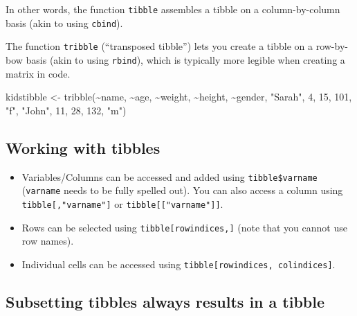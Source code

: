 \documentclass[
]{book}
\newenvironment{Shaded}{\begin{snugshade}}{\end{snugshade}}
\newcommand{\DecValTok}[1]{\textcolor[rgb]{0.00,0.00,0.81}{#1}}
\newcommand{\FunctionTok}[1]{\textcolor[rgb]{0.00,0.00,0.00}{#1}}
\newcommand{\NormalTok}[1]{#1}
\newcommand{\OtherTok}[1]{\textcolor[rgb]{0.56,0.35,0.01}{#1}}
\newcommand{\SpecialCharTok}[1]{\textcolor[rgb]{0.00,0.00,0.00}{#1}}
\newcommand{\StringTok}[1]{\textcolor[rgb]{0.31,0.60,0.02}{#1}}
\providecommand{\tightlist}{%
  \setlength{\itemsep}{0pt}\setlength{\parskip}{0pt}}
\begin{document}
In other words, the function \texttt{tibble} assembles a tibble on a column-by-column basis (akin to using \texttt{cbind}).

The function \texttt{tribble} (``transposed tibble'') lets you create a tibble on a row-by-bow basis (akin to using \texttt{rbind}), which is typically more legible when creating a matrix in code.

\begin{Shaded}
\begin{Highlighting}[]
\NormalTok{kidstibble }\OtherTok{\textless{}{-}} \FunctionTok{tribble}\NormalTok{(}\SpecialCharTok{\textasciitilde{}}\NormalTok{name,   }\SpecialCharTok{\textasciitilde{}}\NormalTok{age, }\SpecialCharTok{\textasciitilde{}}\NormalTok{weight, }\SpecialCharTok{\textasciitilde{}}\NormalTok{height, }\SpecialCharTok{\textasciitilde{}}\NormalTok{gender,}
                      \StringTok{"Sarah"}\NormalTok{,    }\DecValTok{4}\NormalTok{,      }\DecValTok{15}\NormalTok{,     }\DecValTok{101}\NormalTok{,     }\StringTok{"f"}\NormalTok{,}
                      \StringTok{"John"}\NormalTok{,    }\DecValTok{11}\NormalTok{,      }\DecValTok{28}\NormalTok{,     }\DecValTok{132}\NormalTok{,     }\StringTok{"m"}\NormalTok{)}
\end{Highlighting}
\end{Shaded}

\hypertarget{working-with-tibbles}{%
\subsection{Working with tibbles}\label{working-with-tibbles}}

\begin{itemize}
\tightlist
\item
  Variables/Columns can be accessed and added using \texttt{tibble\$varname} (\texttt{varname} needs to be fully spelled out). You can also access a column using \texttt{tibble{[},"varname"{]}} or \texttt{tibble{[}{[}"varname"{]}{]}}.
\item
  Rows can be selected using \texttt{tibble{[}rowindices,{]}} (note that you cannot use row names).
\item
  Individual cells can be accessed using \texttt{tibble{[}rowindices,\ colindices{]}}.
\end{itemize}

\hypertarget{subsetting-tibbles-always-results-in-a-tibble}{%
\subsection{Subsetting tibbles always results in a tibble}\label{subsetting-tibbles-always-results-in-a-tibble}}
\end{document}

